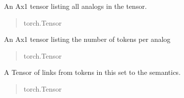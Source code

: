 \documentclass[letterpaper,10pt,english]{sphinxmanual}
\begin{document}
\begin{fulllineitems}
\begin{fulllineitems}
\end{fulllineitems}


\begin{fulllineitems}
\label{\detokenize{nodes:nodes.nodeTensors.Tokens.analogs}}
\pysigstartsignatures
\pysigline
{}
\pysigstopsignatures
\sphinxAtStartPar
An Ax1 tensor listing all analogs in the tensor.
\begin{quote}\begin{description}
\sphinxAtStartPar
torch.Tensor

\end{description}\end{quote}

\end{fulllineitems}


\begin{fulllineitems}
\label{\detokenize{nodes:nodes.nodeTensors.Tokens.analog_counts}}
\pysigstartsignatures
\pysigline
{}
\pysigstopsignatures
\sphinxAtStartPar
An Ax1 tensor listing the number of tokens per analog
\begin{quote}\begin{description}
\sphinxAtStartPar
torch.Tensor

\end{description}\end{quote}

\end{fulllineitems}


\begin{fulllineitems}
\label{\detokenize{nodes:nodes.nodeTensors.Tokens.links}}
\pysigstartsignatures
\pysigline
{}
\pysigstopsignatures
\sphinxAtStartPar
A Tensor of links from tokens in this set to the semantics.
\begin{quote}\begin{description}
\sphinxAtStartPar
torch.Tensor


\end{description}
\end{quote}
\end{fulllineitems}
\end{fulllineitems}
\end{document}
